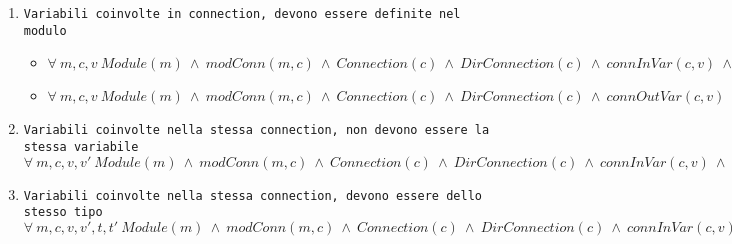 
\begin{enumerate}
	\item \texttt{Variabili coinvolte in connection, devono essere definite nel modulo} \\
		  \begin{itemize}
		  	\item $\forall \ m,c,v \ Module(m) \ \land \ modConn(m, c) \ \land \ Connection(c) \ \land \ DirConnection(c) \ \land \ connInVar(c, v)\ \land \ Variable(v) \ \Rightarrow \ modVar(m, v)$ \\
		  	\item $\forall \ m,c,v \ Module(m) \ \land \ modConn(m, c) \ \land \ Connection(c) \ \land \ DirConnection(c) \ \land \ connOutVar(c, v)\ \land \ Variable(v) \ \Rightarrow \ modVar(m, v)$ \\
		  \end{itemize}
	\item \texttt{Variabili coinvolte nella stessa connection, non devono essere la stessa variabile} \\
		  $\forall \ m,c,v,v' \ Module(m) \ \land \ modConn(m, c) \ \land \ Connection(c) \ \land \ DirConnection(c) \ \land \ connInVar(c, v)\ \land \ Variable(v) \ \land \ connOutVar(c, v') \ \land \ Variable(v') \ \Rightarrow \ v \neq v'$ \\
	\item \texttt{Variabili coinvolte nella stessa connection, devono essere dello stesso tipo} \\
		  $\forall \ m,c,v,v',t,t' \ Module(m) \ \land \ modConn(m, c) \ \land \ Connection(c) \ \land \ DirConnection(c) \ \land \ connInVar(c, v)\ \land \ Variable(v) \ \land \ typeExpr(t, v) \ \land \ Type(t) \ \land \ connOutVar(c, v') \ \land \ Variable(v') \ \Rightarrow \ typeExpr(t, v')$ \\
\end{enumerate}